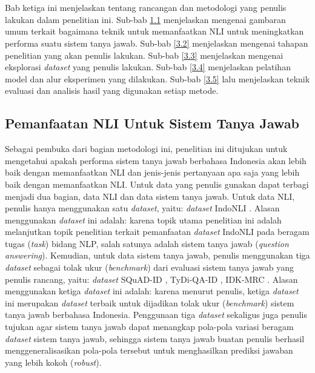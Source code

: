 \chapter{\babTiga}
\label{bab:3}
Bab ketiga ini menjelaskan tentang rancangan dan metodologi yang penulis lakukan dalam penelitian ini. Sub-bab \ref{3.1} menjelaskan mengenai gambaran umum terkait bagaimana teknik untuk memanfaatkan NLI untuk meningkatkan performa suatu sistem tanya jawab. Sub-bab \ref{3.2} menjelaskan mengenai tahapan penelitian yang akan penulis lakukan. Sub-bab \ref{3.3} menjelaskan mengenai eksplorasi \emph{dataset} yang penulis lakukan. Sub-bab \ref{3.4} menjelaskan pelatihan model dan alur eksperimen yang dilakukan. Sub-bab \ref{3.5} lalu menjelaskan teknik evaluasi dan analisis hasil yang digunakan setiap metode.

\section{Pemanfaatan NLI Untuk Sistem Tanya Jawab}
\label{3.1}
Sebagai pembuka dari bagian metodologi ini, penelitian ini ditujukan untuk mengetahui apakah performa sistem tanya jawab berbahasa Indonesia akan lebih baik dengan memanfaatkan NLI dan jenis-jenis pertanyaan apa saja yang lebih baik dengan memanfaatkan NLI. Untuk data yang penulis gunakan dapat terbagi menjadi dua bagian, data NLI dan data sistem tanya jawab. Untuk data NLI, penulis hanya menggunakan satu \emph{dataset}, yaitu: \emph{dataset} IndoNLI \citep{mahendra-etal-2021-indonli}. Alasan menggunakan \emph{dataset} ini adalah: karena topik utama penelitian ini adalah melanjutkan topik penelitian \citet{mahendra-etal-2021-indonli} terkait pemanfaatan \emph{dataset} IndoNLI pada beragam tugas (\emph{task}) bidang NLP, salah satunya adalah sistem tanya jawab (\emph{question answering}). Kemudian, untuk data sistem tanya jawab, penulis menggunakan tiga \emph{dataset} sebagai tolak ukur (\emph{benchmark}) dari evaluasi sistem tanya jawab yang penulis rancang, yaitu: \emph{dataset} SQuAD-ID \citep{muis2020sequencetosequence}, TyDi-QA-ID \citep{cahyawijaya-etal-2021-indonlg}, IDK-MRC \citep{putri-oh-2022-idk}. Alasan menggunakan ketiga \emph{dataset} ini adalah: karena menurut penulis, ketiga \emph{dataset} ini merupakan \emph{dataset} terbaik untuk dijadikan tolak ukur (\emph{benchmark}) sistem tanya jawab berbahasa Indonesia. Penggunaan tiga \emph{dataset} sekaligus juga penulis tujukan agar sistem tanya jawab dapat menangkap pola-pola variasi beragam \emph{dataset} sistem tanya jawab, sehingga sistem tanya jawab buatan penulis berhasil menggeneralisasikan pola-pola tersebut untuk menghasilkan prediksi jawaban yang lebih kokoh (\emph{robust}).

